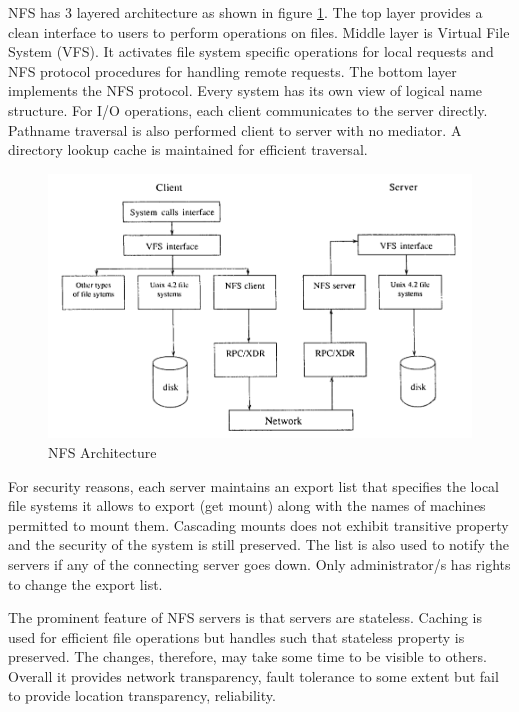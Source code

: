 \documentclass[a4paper,12pt]{article}
\begin{document}
NFS has 3 layered architecture as shown in figure \ref{nfs_design}. The top layer provides a clean interface to users to perform operations on files. Middle layer is Virtual File System (VFS). It activates file system specific operations for local requests and NFS protocol procedures for handling remote requests. The bottom layer implements the NFS protocol. Every system has its own view of logical name structure. For I/O operations, each client communicates to the server directly. Pathname traversal is also performed client to server with no mediator. A directory lookup cache is maintained for efficient traversal.

\begin{figure}[h]
  \begin{center}
    \includegraphics[scale = 0.5]{images/nfs}
  \end{center}
  \caption{NFS Architecture}
  \label{nfs_design}
\end{figure}

For security reasons, each server maintains an export list that specifies the local file systems it allows to export (get mount) along with the names of machines permitted to mount them. Cascading mounts does not exhibit transitive property and the security of the system is still preserved. The list is also used to notify the servers if any of the connecting server goes down. Only administrator/s has rights to change the export list.

The prominent feature of NFS servers is that servers are stateless. Caching is used for efficient file operations but handles such that stateless property is preserved. The changes, therefore, may take some time to be visible to others. Overall it provides network transparency, fault tolerance to some extent but fail to provide location transparency, reliability.
\end{document}
